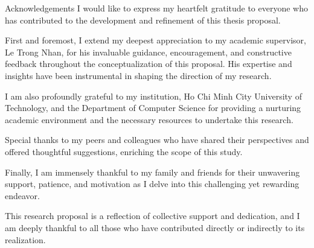 \begin{preface}{Acknowledgements}
  I would like to express my heartfelt gratitude to everyone who has contributed to the development and refinement of this thesis proposal.

  First and foremost, I extend my deepest appreciation to my academic supervisor, Le Trong Nhan, for his invaluable guidance, encouragement, and constructive feedback throughout the conceptualization of this proposal. His expertise and insights have been instrumental in shaping the direction of my research.

  I am also profoundly grateful to my institution, Ho Chi Minh City University of Technology, and the Department of Computer Science for providing a nurturing academic environment and the necessary resources to undertake this research.

  Special thanks to my peers and colleagues who have shared their perspectives and offered thoughtful suggestions, enriching the scope of this study.

  Finally, I am immensely thankful to my family and friends for their unwavering support, patience, and motivation as I delve into this challenging yet rewarding endeavor.

  This research proposal is a reflection of collective support and dedication, and I am deeply thankful to all those who have contributed directly or indirectly to its realization.
\end{preface}
